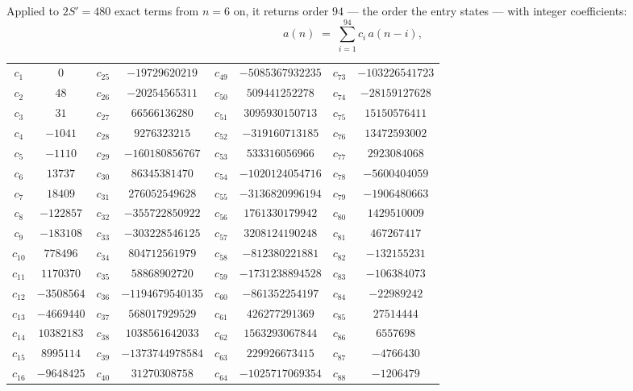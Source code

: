 \documentclass[11pt,a4paper]{article}
\theoremstyle{plain}
\theoremstyle{definition}
\begin{document}
Applied to $2S'=480$ exact terms from $n=6$ on, it returns order $94$ --- the
order the entry states --- with integer coefficients:
\[
a(n)\;=\;\sum_{i=1}^{94}c_i\,a(n-i),
\]
\begin{center}\small
\begin{tabular}{cccccccc}
$c_{1}$ & $0$ & $c_{25}$ & $-19729620219$ & $c_{49}$ & $-5085367932235$ & $c_{73}$ & $-103226541723$ \\
$c_{2}$ & $48$ & $c_{26}$ & $-20254565311$ & $c_{50}$ & $509441252278$ & $c_{74}$ & $-28159127628$ \\
$c_{3}$ & $31$ & $c_{27}$ & $66566136280$ & $c_{51}$ & $3095930150713$ & $c_{75}$ & $15150576411$ \\
$c_{4}$ & $-1041$ & $c_{28}$ & $9276323215$ & $c_{52}$ & $-319160713185$ & $c_{76}$ & $13472593002$ \\
$c_{5}$ & $-1110$ & $c_{29}$ & $-160180856767$ & $c_{53}$ & $533316056966$ & $c_{77}$ & $2923084068$ \\
$c_{6}$ & $13737$ & $c_{30}$ & $86345381470$ & $c_{54}$ & $-1020124054716$ & $c_{78}$ & $-5600404059$ \\
$c_{7}$ & $18409$ & $c_{31}$ & $276052549628$ & $c_{55}$ & $-3136820996194$ & $c_{79}$ & $-1906480663$ \\
$c_{8}$ & $-122857$ & $c_{32}$ & $-355722850922$ & $c_{56}$ & $1761330179942$ & $c_{80}$ & $1429510009$ \\
$c_{9}$ & $-183108$ & $c_{33}$ & $-303228546125$ & $c_{57}$ & $3208124190248$ & $c_{81}$ & $467267417$ \\
$c_{10}$ & $778496$ & $c_{34}$ & $804712561979$ & $c_{58}$ & $-812380221881$ & $c_{82}$ & $-132155231$ \\
$c_{11}$ & $1170370$ & $c_{35}$ & $58868902720$ & $c_{59}$ & $-1731238894528$ & $c_{83}$ & $-106384073$ \\
$c_{12}$ & $-3508564$ & $c_{36}$ & $-1194679540135$ & $c_{60}$ & $-861352254197$ & $c_{84}$ & $-22989242$ \\
$c_{13}$ & $-4669440$ & $c_{37}$ & $568017929529$ & $c_{61}$ & $426277291369$ & $c_{85}$ & $27514444$ \\
$c_{14}$ & $10382183$ & $c_{38}$ & $1038561642033$ & $c_{62}$ & $1563293067844$ & $c_{86}$ & $6557698$ \\
$c_{15}$ & $8995114$ & $c_{39}$ & $-1373744978584$ & $c_{63}$ & $229926673415$ & $c_{87}$ & $-4766430$ \\
$c_{16}$ & $-9648425$ & $c_{40}$ & $31270308758$ & $c_{64}$ & $-1025717069354$ & $c_{88}$ & $-1206479$ \\

\end{tabular}
\end{center}
\end{document}
